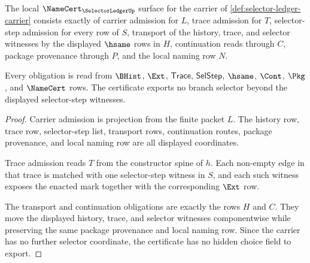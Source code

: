 \begin{theorem}
\label{thm:selector-ledger-namecert-obligations}
The local $\NameCert_{\SelectorLedgerUp}$ surface for the carrier of \autoref{def:selector-ledger-carrier} consists exactly of carrier admission for $L$, trace admission for $T$, selector-step admission for every row of $S$, transport of the history, trace, and selector witnesses by the displayed $\hsame$ rows in $H$, continuation reads through $C$, package provenance through $P$, and the local naming row $N$.

Every obligation is read from $\BHist$, $\Ext$, $\mathsf{Trace}$, $\mathsf{SelStep}$, $\hsame$, $\Cont$, $\Pkg$, and $\NameCert$ rows. The certificate exports no branch selector beyond the displayed selector-step witnesses.
\end{theorem}
\begin{proof}
Carrier admission is projection from the finite packet $L$. The history row, trace row, selector-step list, transport rows, continuation routes, package provenance, and local naming row are all displayed coordinates.

Trace admission reads $T$ from the constructor spine of $h$. Each non-empty edge in that trace is matched with one selector-step witness in $S$, and each such witness exposes the enacted mark together with the corresponding $\Ext$ row.

The transport and continuation obligations are exactly the rows $H$ and $C$. They move the displayed history, trace, and selector witnesses componentwise while preserving the same package provenance and local naming row. Since the carrier has no further selector coordinate, the certificate has no hidden choice field to export.
\end{proof}

